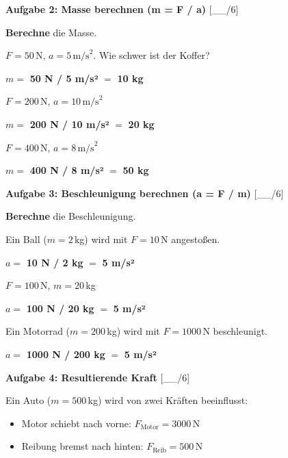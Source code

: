 \documentclass[11pt, a4paper]{article}
\newcommand{\lsg}[1]{\textcolor{loesung}{\textbf{#1}}}
\newcommand{\punktebox}[1]{\hfill\small\textcolor{mittelgrau}{[\_\_/#1]}}
\newcommand{\aufgabe}[1]{%
    \needspace{4\baselineskip}%
    \vspace{10pt}%
    \noindent\textbf{\textcolor{fachfarbe}{Aufgabe #1}}%
    \vspace{4pt}%
    \nopagebreak[4]%
}
\newcommand{\operator}[1]{\textbf{\textcolor{fachfarbe}{#1}}}
\begin{document}

\aufgabe{2: Masse berechnen (m = F / a)} \punktebox{6}

\operator{Berechne} die Masse.

\begin{teil}
    \item $F = 50\,$N, $a = 5\,\text{m/s}^2$. Wie schwer ist der Koffer?

    \vspace{0.3em}
    $m = $ \lsg{50 N / 5 m/s²} $= $ \lsg{10 kg}

    \item $F = 200\,$N, $a = 10\,\text{m/s}^2$

    \vspace{0.3em}
    $m = $ \lsg{200 N / 10 m/s²} $= $ \lsg{20 kg}

    \item $F = 400\,$N, $a = 8\,\text{m/s}^2$

    \vspace{0.3em}
    $m = $ \lsg{400 N / 8 m/s²} $= $ \lsg{50 kg}
\end{teil}


\aufgabe{3: Beschleunigung berechnen (a = F / m)} \punktebox{6}

\operator{Berechne} die Beschleunigung.

\begin{teil}
    \item Ein Ball ($m = 2\,$kg) wird mit $F = 10\,$N angestoßen.

    \vspace{0.3em}
    $a = $ \lsg{10 N / 2 kg} $= $ \lsg{5 m/s²}

    \item $F = 100\,$N, $m = 20\,$kg

    \vspace{0.3em}
    $a = $ \lsg{100 N / 20 kg} $= $ \lsg{5 m/s²}

    \item Ein Motorrad ($m = 200\,$kg) wird mit $F = 1000\,$N beschleunigt.

    \vspace{0.3em}
    $a = $ \lsg{1000 N / 200 kg} $= $ \lsg{5 m/s²}
\end{teil}


\aufgabe{4: Resultierende Kraft} \punktebox{6}

Ein Auto ($m = 500\,$kg) wird von zwei Kräften beeinflusst:
\begin{itemize}[leftmargin=2em, itemsep=2pt]
    \item Motor schiebt nach vorne: $F_{\text{Motor}} = 3000\,$N
    \item Reibung bremst nach hinten: $F_{\text{Reib}} = 500\,$N
\end{itemize}
\end{document}
